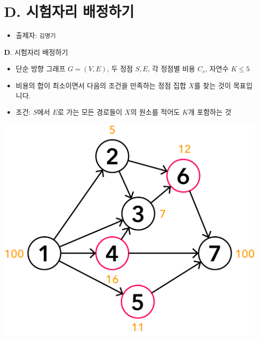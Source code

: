 \section{D. 시험자리 배정하기}

\begin{frame} %
    \begin{itemize}
        \item 출제자: \texttt{김명기}
    \end{itemize}
\end{frame}

\begin{frame}{\textbf{D}. 시험자리 배정하기}

    \begin{itemize}
        \item 단순 방향 그래프 $G = (V, E)$, 두 정점 $S, E$, 각 정점별 비용 $C_v$, 자연수 $K \leq 5$
        \item 비용의 합이 최소이면서 다음의 조건을 만족하는 정점 집합 $X$를 찾는 것이 목표입니다.
        \item 조건: $S$에서 $E$로 가는 모든 경로들이 $X$의 원소를 적어도 $K$개 포함하는 것
    \end{itemize}
    
    \begin{center}
        \includegraphics[width=0.3\linewidth]{../images/setting-maps/maps_ex_1.png}
    \end{center}
    
\end{frame}